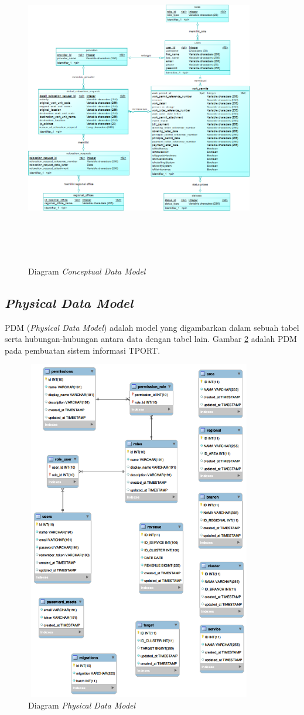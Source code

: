 	\begin{figure}[h!]
	\centerline
	{\includegraphics[width=10cm,height=14cm]{bab4/CDM.png}}
	\caption{Diagram \textit{Conceptual Data Model}}
	\label{figure:CDM}
	\end{figure}
	
\subsection{\textit{Physical Data Model}}
PDM (\textit{Physical Data Model}) adalah model yang digambarkan dalam sebuah tabel serta hubungan-hubungan antara data dengan tabel lain. Gambar \ref{figure:PDM} adalah PDM pada pembuatan sistem informasi TPORT.

	\begin{figure}[h!]
	\centerline
	{\includegraphics[width=10cm,height=15cm]{bab4/PDM.png}}
	\caption{Diagram \textit{Physical Data Model}}
	\label{figure:PDM}
	\end{figure}